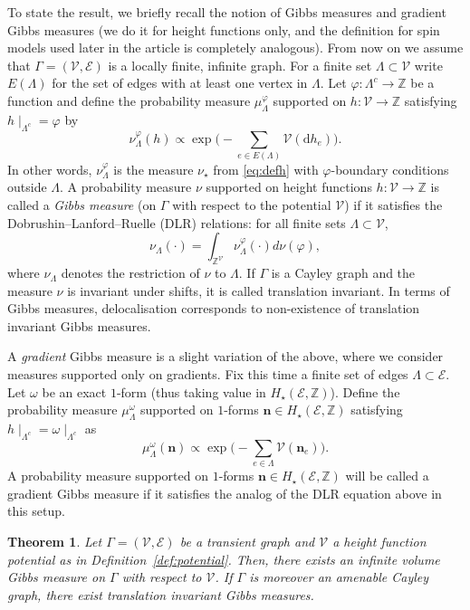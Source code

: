 \documentclass[11pt, reqno]{amsart}
\newtheorem{theorem}{Theorem}[section]
\numberwithin{equation}{section}
\theoremstyle{definition}
\theoremstyle{remark}
\newcommand{\ZZ}{\mathbb{Z}}
\newcommand{\PP}{\nu}
\renewcommand{\d}{\mathrm{d}}
\renewcommand{\c}[1]{\ensuremath{\mathcal{#1}}}
\newcommand{\n}{\mathbf{n}}
\newcommand{\exact}{\star}
\newcommand{\Hcycle}{\ensuremath{H_{\star}}}
\begin{document}
To state the result, we briefly recall the notion of Gibbs measures and {gradient} Gibbs measures (we do it for height functions only, and the definition for spin models used later in the article is completely analogous).
From now on we assume that $\Gamma = (\mathscr V, \mathscr E)$ is a locally finite, infinite graph. 
For a finite set $\Lambda \subset \mathscr V$ write $E(\Lambda)$ for the set of edges with at least one vertex in $\Lambda$.  
Let $\varphi: \Lambda^c \to \ZZ$ be a function and define the probability measure $\mu_{\Lambda}^\varphi$ 
supported on $h: \mathscr{V} \to \ZZ$ satisfying $h \mid_{\Lambda^c} = \varphi$ by
\[
	\nu_{\Lambda}^{\varphi}(h) \propto \exp \Big(-\sum_{e \in E(\Lambda)} \c{V}(\d h_e)\Big). 
\]
In other words, $\nu_{\Lambda}^\varphi$ is the measure $\PP_{\exact}$ from \eqref{eq:defh} with $\varphi$-boundary conditions outside $\Lambda$. 
A probability measure $\nu$ supported on height functions $h: \mathscr V \to \ZZ$ is called a \textit{Gibbs measure} (on $\Gamma$ with respect to the potential $\c{V}$) if it satisfies the Dobrushin--Lanford--Ruelle (DLR) relations:
for all finite sets $\Lambda \subset \mathscr{V}$, 
\[
	\nu_{\Lambda}(\cdot) = \int_{\mathbb{Z}^{\mathscr V}} \nu_{\Lambda}^{\varphi}(\cdot) d \nu(\varphi), 
\]
where $\nu_{\Lambda}$ denotes the restriction of $\nu$ to $\Lambda$.
If $\Gamma$ is a Cayley graph and the measure $\nu$ is invariant under shifts, it is called translation invariant. 
In terms of Gibbs measures, delocalisation corresponds to non-existence of translation invariant Gibbs measures. 

A \emph{gradient} Gibbs measure is a slight variation of the above, where we consider measures supported only on gradients. 
Fix this time a finite set of edges $\Lambda \subset \mathscr{E}$. Let $\omega$ be an exact $1$-form (thus taking value in $\Hcycle(\mathscr{E}, \ZZ)$). 
Define the probability measure $\mu_{\Lambda}^{\omega}$ supported on $1$-forms $\n \in \Hcycle(\mathscr{E}, \ZZ)$ satisfying $h \mid_{\Lambda^c} = \omega \mid_{\Lambda^c}$ as
\[
	\mu_{\Lambda}^{\omega}(\n) \propto \exp\Big(-\sum_{e \in \Lambda} \c{V}(\n_e)\Big). 
\]
A probability measure supported on $1$-forms $\n \in \Hcycle(\mathscr{E}, \ZZ)$ will be called a gradient Gibbs measure if it satisfies the analog of the DLR equation above
in this setup. 

\begin{theorem} \label{thm:extransinv}
	Let $\Gamma = (\mathscr V,\mathscr E)$ be a transient graph and $\c{V}$ a height function potential as in Definition~\ref{def:potential}. 
	Then, there exists an infinite volume Gibbs measure on $\Gamma$ with respect to $\mathcal V$. If $\Gamma$ is moreover an amenable Cayley graph, 
	there exist translation invariant Gibbs measures. 
\end{theorem}
\end{document}
